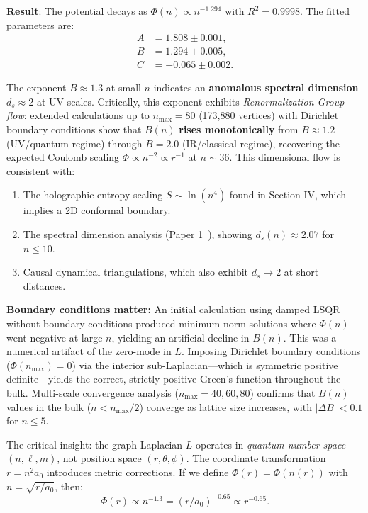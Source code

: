 \documentclass[aps,prd,twocolumn,superscriptaddress,groupedaddress,showpacs]{revtex4-2}
\begin{document}
\textbf{Result}: The potential decays as $\Phi(n) \propto n^{-1.294}$ with $R^2 = 0.9998$. The fitted parameters are:
\begin{align}
A &= 1.808 \pm 0.001, \\
B &= 1.294 \pm 0.005, \\
C &= -0.065 \pm 0.002.
\end{align}

The exponent $B \approx 1.3$ at small $n$ indicates an \textbf{anomalous spectral dimension} $d_s \approx 2$ at UV scales. Critically, this exponent exhibits \emph{Renormalization Group flow}: extended calculations up to $n_{\mathrm{max}}=80$ (173,880 vertices) with Dirichlet boundary conditions show that $B(n)$ \textbf{rises monotonically} from $B \approx 1.2$ (UV/quantum regime) through $B = 2.0$ (IR/classical regime), recovering the expected Coulomb scaling $\Phi \propto n^{-2} \propto r^{-1}$ at $n \sim 36$. This dimensional flow is consistent with:
\begin{enumerate}
\item The holographic entropy scaling $S \sim \ln(n^4)$ found in Section IV, which implies a 2D conformal boundary.
\item The spectral dimension analysis (Paper 1~\cite{Louthan_I}), showing $d_s(n) \approx 2.07$ for $n \leq 10$.
\item Causal dynamical triangulations, which also exhibit $d_s \to 2$ at short distances.
\end{enumerate}

\textbf{Boundary conditions matter:} An initial calculation using damped LSQR without boundary conditions produced minimum-norm solutions where $\Phi(n)$ went negative at large $n$, yielding an artificial decline in $B(n)$. This was a numerical artifact of the zero-mode in $L$. Imposing Dirichlet boundary conditions ($\Phi(n_{\mathrm{max}})=0$) via the interior sub-Laplacian---which is symmetric positive definite---yields the correct, strictly positive Green's function throughout the bulk. Multi-scale convergence analysis ($n_{\mathrm{max}}=40,60,80$) confirms that $B(n)$ values in the bulk ($n < n_{\mathrm{max}}/2$) converge as lattice size increases, with $|\Delta B| < 0.1$ for $n \leq 5$.

The critical insight: the graph Laplacian $L$ operates in \emph{quantum number space} $(n, \ell, m)$, not position space $(r, \theta, \phi)$. The coordinate transformation $r = n^2 a_0$ introduces metric corrections. If we define $\Phi(r) = \Phi(n(r))$ with $n = \sqrt{r/a_0}$, then:
\begin{equation}
\Phi(r) \propto n^{-1.3} = (r/a_0)^{-0.65} \propto r^{-0.65}.
\end{equation}
\end{document}
